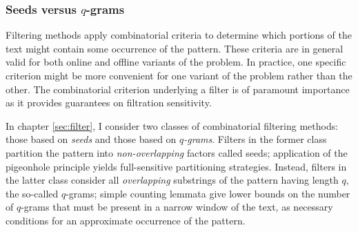 \subsubsection{Seeds versus $q$-grams}

Filtering methods apply combinatorial criteria to determine which portions of the text might contain some occurrence of the pattern.
These criteria are in general valid for both online and offline variants of the problem.
In practice, one specific criterion might be more convenient for one variant of the problem rather than the other.
The combinatorial criterion underlying a filter is of paramount importance as it provides guarantees on filtration sensitivity.

In chapter \ref{sec:filter}, I consider two classes of combinatorial filtering methods: those based on \emph{seeds} and those based on \emph{$q$-grams}.
Filters in the former class partition the pattern into \emph{non-overlapping} factors called seeds;
application of the pigeonhole principle yields full-sensitive partitioning strategies.
Instead, filters in the latter class consider all \emph{overlapping} substrings of the pattern having length $q$, the so-called $q$-grams;
simple counting lemmata give lower bounds on the number of $q$-grams that must be present in a narrow window of the text, as necessary conditions for an approximate occurrence of the pattern.
